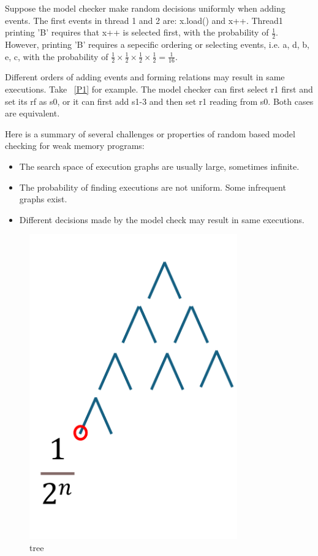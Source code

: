 Suppose the model checker make random decisions uniformly when adding events. The first events in thread 1 and 2 are: x.load() and x++. Thread1 printing 'B' requires that x++ is selected first, with the probability of $\frac{1}{2}$. However, printing 'B' requires a sepecific ordering or selecting events, i.e. {a, d, b, e, c}, with the probability of $\frac{1}{2} \times \frac{1}{2}  \times \frac{1}{2}  \times \frac{1}{2} =  \frac{1}{16}$.


Different orders of adding events and forming relations may result in same executions. Take ~\ref{P1} for example. The model checker can first select r1 first and set its rf as s0, or it can first add s1-3 and then set r1 reading from s0. Both cases are equivalent.

Here is a summary of several challenges or properties of random based model checking for weak memory programs:
\begin{itemize}
    \item The search space of execution graphs are usually large, sometimes infinite.
    \item The probability of finding executions are not uniform. Some infrequent graphs exist.
    \item Different decisions made by the model check may result in same executions.
\end{itemize}


\begin{figure}[htbp] %
    \centering
    \includegraphics[width=0.8\textwidth]{figure/tree.pdf} %
    \caption{tree} %
    \label{fig:example} %
\end{figure}








